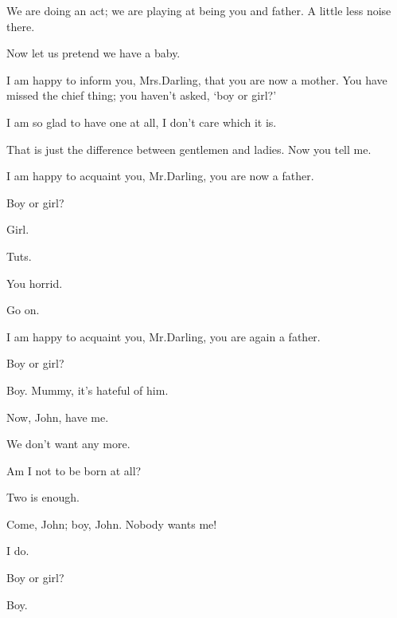 \begin{drama}
We are doing an act; we are playing at being you and father.
A little less noise there.

\wendyspeaks
Now let us pretend we have a baby.

I am happy to inform you, Mrs.\@ Darling, that you are now a mother.
You have missed the chief thing; you haven’t asked, ‘boy or girl?’

\wendyspeaks
I am so glad to have one at all, I don’t care which it is.

That is just the difference between gentlemen and ladies.
Now you tell me.

\wendyspeaks
I am happy to acquaint you, Mr.\@ Darling, you are now a father.

\johnspeaks
Boy or girl?

Girl.

\johnspeaks
Tuts.

\wendyspeaks
You horrid.

\johnspeaks
Go on.

\wendyspeaks
I am happy to acquaint you, Mr.\@ Darling, you are again a father.

\johnspeaks
Boy or girl?

\wendyspeaks
Boy.
Mummy, it’s hateful of him.


Now, John, have me.

\johnspeaks
We don’t want any more.

Am I not to be born at all?

\johnspeaks
Two is enough.

Come, John; boy, John.
Nobody wants me!

\mrsdarlingspeaks
I do.

Boy or girl?

Boy.


\end{drama}
